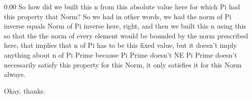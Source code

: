 \begin{unfinished}{0:00}
So how did we built this n from this absolute value here for which Pi had this property that Norm? So we had in other words, we had the norm of Pi inverse equals Norm of Pi inverse here, right, and then we built this n using this so that the the norm of every element would be bounded by the norm prescribed here, that implies that n of Pi has to be this fixed value, but it doesn't imply anything about n of Pi Prime because Pi Prime doesn't NE Pi Prime doesn't necessarily satisfy this property for this Norm, it only satisfies it for this Norm always.

Okay, thanks.

\end{unfinished}
